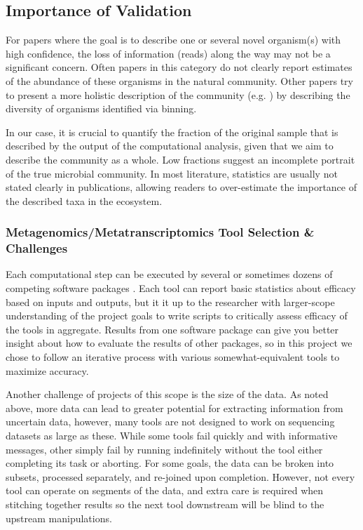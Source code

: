 \subsection{Importance of Validation}
For papers where the goal is to describe one or several novel organism(s) with high confidence, the loss of information (reads) along the way may not be a significant concern.
Often papers in this category do not clearly report estimates of the abundance of these organisms in the natural community.
Other papers try to present a more holistic description of the community (e.g. \cite{kantor2017}) by describing the diversity of organisms identified via binning.

In our case, it is crucial to quantify the fraction of the original sample that is described by the output of the computational analysis, given that we aim to describe the community as a whole.
Low fractions suggest an incomplete portrait of the true microbial community.
In most literature, statistics are usually not stated clearly in publications, allowing readers to over-estimate the importance of the described taxa in the ecosystem.

\subsubsection{Metagenomics/Metatranscriptomics Tool Selection \& Challenges}
Each computational step can be executed by several or sometimes dozens of competing software packages \cite{sangwan2016,thomas2012}.
Each tool can report basic statistics about efficacy based on inputs and outputs, but it it up to the researcher with larger-scope understanding of the project goals to write scripts to critically assess efficacy of the tools in aggregate.
Results from one software package can give you better insight about how to evaluate the results of other packages, so in this project we chose to follow an iterative process with various somewhat-equivalent tools to maximize accuracy.

Another challenge of projects of this scope is the size of the data.
As noted above, more data can lead to greater potential for extracting information from uncertain data, however, many tools are not designed to work on sequencing datasets as large as these.
While some tools fail quickly and with informative messages, other simply fail by running indefinitely without the tool either completing its task or aborting.
For some goals, the data can be broken into subsets, processed separately, and re-joined upon completion.
However, not every tool can operate on segments of the data, and extra care is required when stitching together results so the next tool downstream will be blind to the upstream manipulations.

